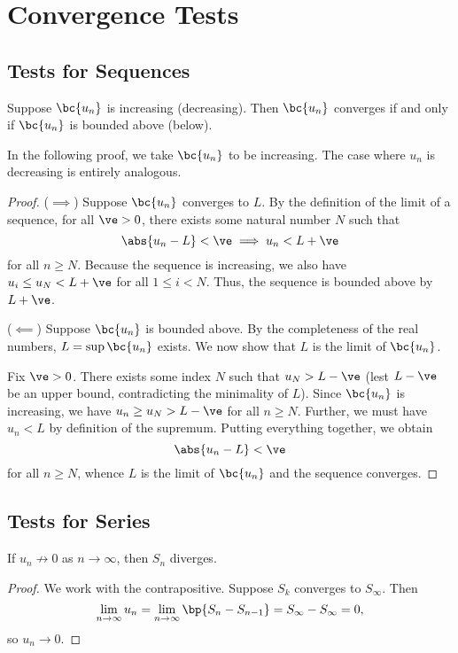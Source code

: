 \chapter{Convergence Tests}

\section{Tests for Sequences}\label{sec:convergence-sequence}

\begin{theorem}
    Suppose $\bc{u_n}$ is increasing (decreasing). Then $\bc{u_n}$ converges if and only if $\bc{u_n}$ is bounded above (below).
\end{theorem}
In the following proof, we take $\bc{u_n}$ to be increasing. The case where $u_n$ is decreasing is entirely analogous.
\begin{proof}
    ($\implies$) Suppose $\bc{u_n}$ converges to $L$. By the definition of the limit of a sequence, for all $\ve > 0$, there exists some natural number $N$ such that \[\abs{u_n - L} < \ve \implies u_n < L + \ve\] for all $n \geq N$. Because the sequence is increasing, we also have $u_i \leq u_N < L + \ve$ for all $1 \leq i < N$. Thus, the sequence is bounded above by $L + \ve$.
    
    ($\impliedby$) Suppose $\bc{u_n}$ is bounded above. By the completeness of the real numbers, $L = \sup \bc{u_n}$ exists. We now show that $L$ is the limit of $\bc{u_n}$.
    
    Fix $\ve > 0$. There exists some index $N$ such that $u_N > L - \ve$ (lest $L - \ve$ be an upper bound, contradicting the minimality of $L$). Since $\bc{u_n}$ is increasing, we have $u_n \geq u_N > L - \ve$ for all $n \geq N$. Further, we must have $u_n < L$ by definition of the supremum. Putting everything together, we obtain \[\abs{u_n - L} < \ve\] for all $n \geq N$, whence $L$ is the limit of $\bc{u_n}$ and the sequence converges.
\end{proof}

\section{Tests for Series}\label{sec:convergence-series}

\begin{theorem}
    If $u_n \not\to 0$ as $n \to \infty$, then $S_n$ diverges.
\end{theorem}
\begin{proof}
    We work with the contrapositive. Suppose $S_k$ converges to $S_{\infty}$. Then \[\lim_{n \to \infty} u_n = \lim_{n \to \infty} \bp{S_{n} - S_{n-1}} = S_{\infty} - S_{\infty} = 0,\] so $u_n \to 0$.
\end{proof}

